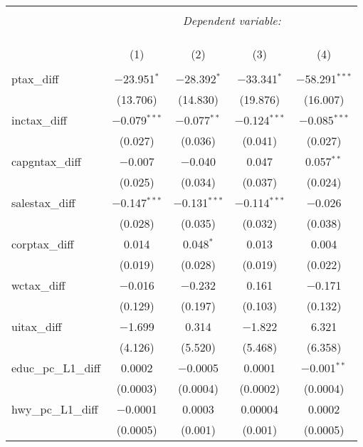 
\begin{table}[!htbp] \centering 
  \caption{} 
  \label{} 
\begin{tabular}{@{\extracolsep{5pt}}lcccc} 
\\[-1.8ex]\hline 
\hline \\[-1.8ex] 
 & \multicolumn{4}{c}{\textit{Dependent variable:}} \\ 
\cline{2-5} 
\\[-1.8ex] & \multicolumn{4}{c}{ } \\ 
\\[-1.8ex] & (1) & (2) & (3) & (4)\\ 
\hline \\[-1.8ex] 
 ptax\_diff & $-$23.951$^{*}$ & $-$28.392$^{*}$ & $-$33.341$^{*}$ & $-$58.291$^{***}$ \\ 
  & (13.706) & (14.830) & (19.876) & (16.007) \\ 
  inctax\_diff & $-$0.079$^{***}$ & $-$0.077$^{**}$ & $-$0.124$^{***}$ & $-$0.085$^{***}$ \\ 
  & (0.027) & (0.036) & (0.041) & (0.027) \\ 
  capgntax\_diff & $-$0.007 & $-$0.040 & 0.047 & 0.057$^{**}$ \\ 
  & (0.025) & (0.034) & (0.037) & (0.024) \\ 
  salestax\_diff & $-$0.147$^{***}$ & $-$0.131$^{***}$ & $-$0.114$^{***}$ & $-$0.026 \\ 
  & (0.028) & (0.035) & (0.032) & (0.038) \\ 
  corptax\_diff & 0.014 & 0.048$^{*}$ & 0.013 & 0.004 \\ 
  & (0.019) & (0.028) & (0.019) & (0.022) \\ 
  wctax\_diff & $-$0.016 & $-$0.232 & 0.161 & $-$0.171 \\ 
  & (0.129) & (0.197) & (0.103) & (0.132) \\ 
  uitax\_diff & $-$1.699 & 0.314 & $-$1.822 & 6.321 \\ 
  & (4.126) & (5.520) & (5.468) & (6.358) \\ 
  educ\_pc\_L1\_diff & 0.0002 & $-$0.0005 & 0.0001 & $-$0.001$^{**}$ \\ 
  & (0.0003) & (0.0004) & (0.0002) & (0.0004) \\ 
  hwy\_pc\_L1\_diff & $-$0.0001 & 0.0003 & 0.00004 & 0.0002 \\ 
  & (0.0005) & (0.001) & (0.001) & (0.0005) \\ 

\end{tabular}
\end{table}
